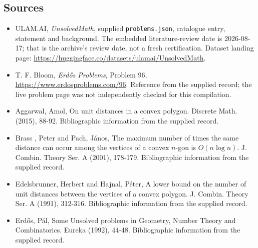 \documentclass[11pt,a4paper]{article}
\begin{document}
\subsection{Sources}

{\small

\begin{itemize}

\item[\hypertarget{source:statement:1}{S1}] ULAM.AI, \emph{UnsolvedMath}, supplied \texttt{problems.json}, catalogue entry, statement and background. The embedded literature-review date is 2026-08-17; that is the archive’s review date, not a fresh certification. Dataset landing page: \url{https://huggingface.co/datasets/ulamai/UnsolvedMath}.

\item[\hypertarget{source:statement:2}{S2}] T. F. Bloom, \emph{Erdős Problems}, Problem 96, \url{https://www.erdosproblems.com/96}. Reference from the supplied record; the live problem page was not independently checked for this compilation.

\item[\hypertarget{source:statement:3}{S3}] Aggarwal, Amol, On unit distances in a convex polygon. Discrete Math. (2015), 88-92. Bibliographic information from the supplied record.

\item[\hypertarget{source:statement:4}{S4}] Brass , Peter and Pach, J\'{a}nos, The maximum number of times the same distance can occur among the vertices of a convex {$n$}-gon is {$O(n\log n)$}. J. Combin. Theory Ser. A (2001), 178-179. Bibliographic information from the supplied record.

\item[\hypertarget{source:statement:5}{S5}] Edelsbrunner, Herbert and Hajnal, P\'{e}ter, A lower bound on the number of unit distances between the vertices of a convex polygon. J. Combin. Theory Ser. A (1991), 312-316. Bibliographic information from the supplied record.

\item[\hypertarget{source:statement:6}{S6}] Erd\H{o}s, P\'{a}l, Some Unsolved problems in Geometry, Number Theory and Combinatorics. Eureka (1992), 44-48. Bibliographic information from the supplied record.

\end{itemize}

}

\label{end:statement}
\end{document}
